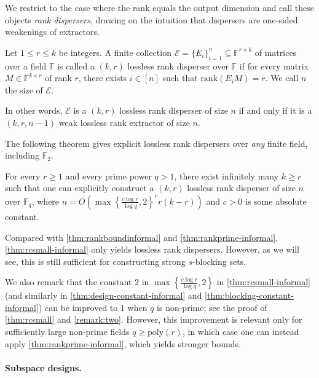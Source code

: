 \documentclass[11pt]{article}
\newcommand{\rank}{\mathrm{rank}}
\newcommand{\F}{\mathbb{F}}
\newcommand{\poly}{\mathrm{poly}}
\begin{document}
We restrict to the case where the rank equals the output dimension and call these objects \emph{rank dispersers}, drawing on the intuition that dispersers are one-sided weakenings of extractors.

\begin{definition}\label{defi:disperser}
Let $1\leq r\le k$ be integers. A finite collection $\mathcal{E}=\{E_i\}_{i=1}^n \subseteq \F^{r\times k}$ of matrices over a field $\F$ is called a $(k,r)$ lossless rank disperser over $\F$ if for every matrix $M \in \F^{k \times r}$ of rank $r$, there exists $i\in [n]$ such that $\rank(E_i M) = r$.
We call $n$ the size of $\mathcal{E}$.
\end{definition}

In other words, $\mathcal{E}$ is a $(k,r)$ lossless rank disperser of size $n$ if and only if it is a $(k,r,n-1)$ weak lossless rank extractor of size $n$.

The following theorem gives explicit lossless rank dispersers over \emph{any} finite field, including $\F_2$.

\begin{theorem}\label{thm:rcsmall-informal}
For every $r\geq 1$ and every prime power $q>1$, there exist infinitely many $k\geq r$ such that one can explicitly construct a $(k,r)$ lossless rank disperser of size $n$ over $\F_q$, where $n=O\left(\max\left\{\frac{c\log r}{\log q},2\right\}^r r(k-r)\right)$ and $c>0$ is some absolute constant.
\end{theorem}

Compared with \cref{thm:rankboundinformal} and \cref{thm:rankprime-informal}, \cref{thm:rcsmall-informal} only yields lossless rank dispersers. However, as we will see, this is still sufficient for constructing strong $s$-blocking sets.

We also remark that the constant $2$ in $\max\left\{\frac{c\log r}{\log q},2\right\}$ in \cref{thm:rcsmall-informal} (and similarly in \cref{thm:design-constant-informal} and \cref{thm:blocking-constant-informal}) can be improved to $1$ when $q$ is non-prime; see the proof of \cref{thm:rcsmall} and \cref{remark:two}. However, this improvement is relevant only for sufficiently large non-prime fields $q \ge \poly(r)$, in which case one can instead apply \cref{thm:rankprime-informal}, which yields stronger bounds.

\paragraph{Subspace designs.}
\end{document}
